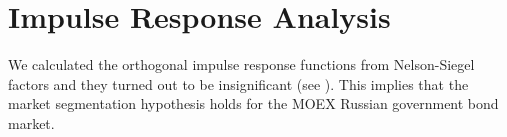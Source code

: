 \section{Impulse Response Analysis}\label{sec:IRA}
    We calculated the orthogonal impulse response functions from Nelson-Siegel factors and they turned out to be insignificant (see ). This implies that the 
    market segmentation hypothesis holds for the MOEX Russian government bond market.
